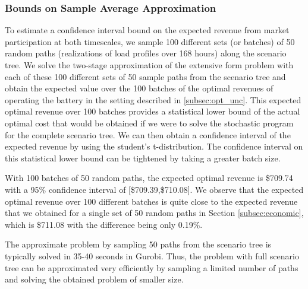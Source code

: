 \documentclass[11pt,twoside]{article}
\begin{document}
\subsubsection{Bounds on Sample Average Approximation}\label{subsec:sampleavg}
To estimate a confidence interval bound on the expected revenue from market participation at both timescales, we sample 100 different sets (or batches) of 50 random paths (realizations of load profiles over 168 hours) along the scenario tree. We solve the two-stage approximation of the extensive form problem with each of these 100 different sets of 50 sample paths from the scenario tree and obtain the expected value over the 100 batches of the optimal revenues of operating the battery in the setting described in \ref{subsec:opt_unc}. This expected optimal revenue over 100 batches provides a statistical lower bound of the actual optimal cost that would be obtained if we were to solve the stochastic program for the complete scenario tree. We can then obtain a confidence interval of the expected revenue by using the student's t-distribution. The confidence interval on this statistical lower bound can be tightened by taking a greater batch size. 

With 100 batches of 50 random paths, the expected optimal revenue is \$709.74 with a 95\% confidence interval of [\$709.39,\$710.08]. We observe that the expected optimal revenue over 100 different batches is quite close to the expected revenue that we obtained for a single set of 50 random paths in Section \ref{subsec:economic}, which is \$711.08 with the difference being only 0.19\%. 

The approximate problem by sampling 50 paths from the scenario tree is typically solved in 35-40 seconds in Gurobi. Thus, the problem with full scenario tree can be approximated very efficiently by sampling a limited number of paths and solving the obtained problem of smaller size.
\end{document}
